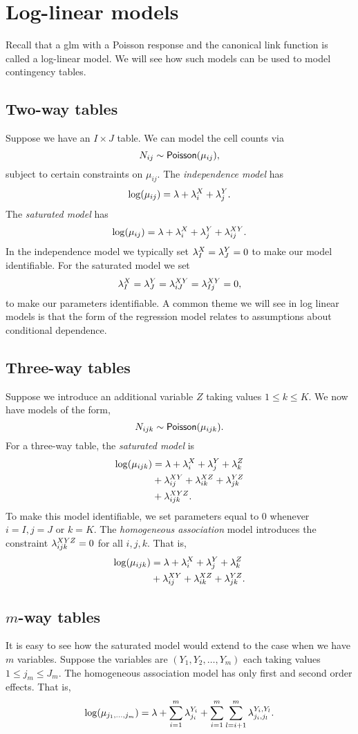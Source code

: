 \section{Log-linear models}
Recall that a glm with a Poisson response and the canonical link function is called a log-linear model. We will see how such models can be used to model contingency tables.

\subsection{Two-way tables}
Suppose we have an $I \times J$ table. We can model the cell counts via 
\[N_{ij} \sim \mathsf{Poisson}(\mu_{ij}), \]
subject to certain constraints on $\mu_{ij}$. The \emph{independence model} has 
\[\log(\mu_{ij}) = \lambda + \lambda_i^X + \lambda_j^Y. \]
The \emph{saturated model} has 
\[\log(\mu_{ij}) =  \lambda + \lambda_i^X + \lambda_j^Y + \lambda_{ij}^{XY}.\]
In the independence model we typically set $\lambda_I^X=\lambda_J^Y=0$ to make our model identifiable. For the saturated model we set 
\[\lambda_I^X = \lambda_J^Y = \lambda_{iJ}^{XY}=\lambda_{Ij}^{XY}=0, \]
to make our parameters identifiable. A common theme we will see in log linear models is that the form of the regression model relates to assumptions about conditional dependence.

\subsection{Three-way tables}
Suppose we introduce an additional variable $Z$ taking values $1\le k \le K$. We now have models of the form,
\[N_{ijk} \sim \mathsf{Poisson}(\mu_{ijk}). \]
For a three-way table, the \emph{saturated model} is 
\begin{align*}
    \log(\mu_{ijk}) &=\lambda +\lambda^X_i+\lambda^Y_j+\lambda^Z_k\\
    &+\lambda^{XY}_{ij}+\lambda^{XZ}_{ik}+\lambda^{YZ}_{jk}\\
    &+\lambda^{XYZ}_{ijk}.
\end{align*}
To make this model identifiable, we set parameters equal to 0 whenever $i=I,j=J$ or $k=K$. The \emph{homogeneous association} model introduces the constraint $\lambda^{XYZ}_{ijk}=0$ for all $i,j,k$. That is,
\begin{align*}
    \log(\mu_{ijk}) &=\lambda +\lambda^X_i+\lambda^Y_j+\lambda^Z_k\\
    &+\lambda^{XY}_{ij}+\lambda^{XZ}_{ik}+\lambda^{YZ}_{jk}.
\end{align*}
\subsection{$m$-way tables}
It is easy to see how the saturated model would extend to the case when we have $m$ variables. Suppose the variables are $(Y_1,Y_2,\ldots,Y_m)$ each taking values $1 \le j_m \le J_m$. The homogeneous association model has only first and second order effects. That is,
\[\log(\mu_{j_1,\ldots,j_m}) = \lambda + \sum_{i=1}^m \lambda^{Y_i}_{j_i}+\sum_{i=1}^m\sum_{l=i+1}^m \lambda^{Y_i,Y_l}_{j_i,j_l}. \]
